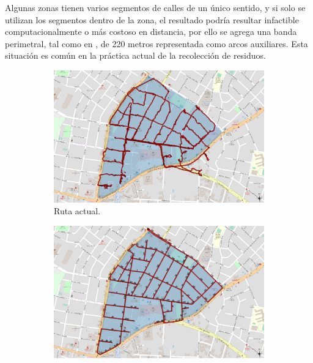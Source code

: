 \documentclass[spanish, conference]{IEEEtran}
\begin{document}
Algunas zonas tienen varios segmentos de calles de un único sentido, y si solo se utilizan los segmentos dentro de la zona, el resultado podría resultar infactible computacionalmente o más costoso en distancia, por ello se agrega una banda perimetral, tal como en \cite{Braier2017AnArgentina}, de 220 metros representada como arcos auxiliares. Esta situación es común en la práctica actual de la recolección de residuos.

\begin{figure}[htbp]
  \centering
  \begin{subfigure}[b]{0.45\textwidth}
    \includegraphics[width=\textwidth]{imagenes/recorrido83Actual.png}
    \caption{Ruta actual.}
    \label{fig:RecorridoActualZona83}
  \end{subfigure}
  \hfill
  \begin{subfigure}[b]{0.45\textwidth}
    \includegraphics[width=\textwidth]{imagenes/recorrido83.png}

\end{subfigure}
\end{figure}
\end{document}

